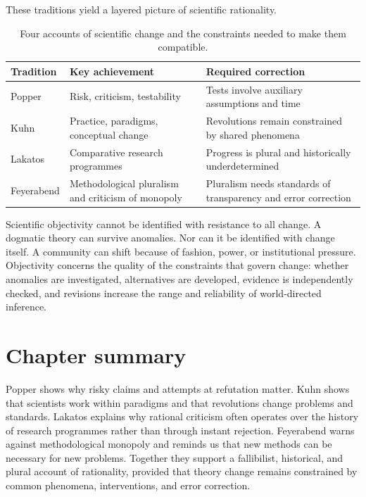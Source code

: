 These traditions yield a layered picture of scientific rationality.

\begin{table}[ht]
\centering
\smalltable
\begin{tabularx}{\textwidth}{p{}YY}
\toprule
Tradition & Key achievement & Required correction\\
\midrule
Popper & Risk, criticism, testability & Tests involve auxiliary assumptions and time\\
Kuhn & Practice, paradigms, conceptual change & Revolutions remain constrained by shared phenomena\\
Lakatos & Comparative research programmes & Progress is plural and historically underdetermined\\
Feyerabend & Methodological pluralism and criticism of monopoly & Pluralism needs standards of transparency and error correction\\
\bottomrule
\end{tabularx}
\caption{Four accounts of scientific change and the constraints needed to
make them compatible.}
\label{tab:change-traditions}
\end{table}

Scientific objectivity cannot be identified with resistance to all change. A
dogmatic theory can survive anomalies. Nor can it be identified with change
itself. A community can shift because of fashion, power, or institutional
pressure. Objectivity concerns the quality of the constraints that govern
change: whether anomalies are investigated, alternatives are developed,
evidence is independently checked, and revisions increase the range and
reliability of world-directed inference.

\section*{Chapter summary}

Popper shows why risky claims and attempts at refutation matter. Kuhn shows
that scientists work within paradigms and that revolutions change problems and
standards. Lakatos explains why rational criticism often operates over the
history of research programmes rather than through instant rejection.
Feyerabend warns against methodological monopoly and reminds us that new
methods can be necessary for new problems. Together they support a fallibilist,
historical, and plural account of rationality, provided that theory change
remains constrained by common phenomena, interventions, and error correction.

